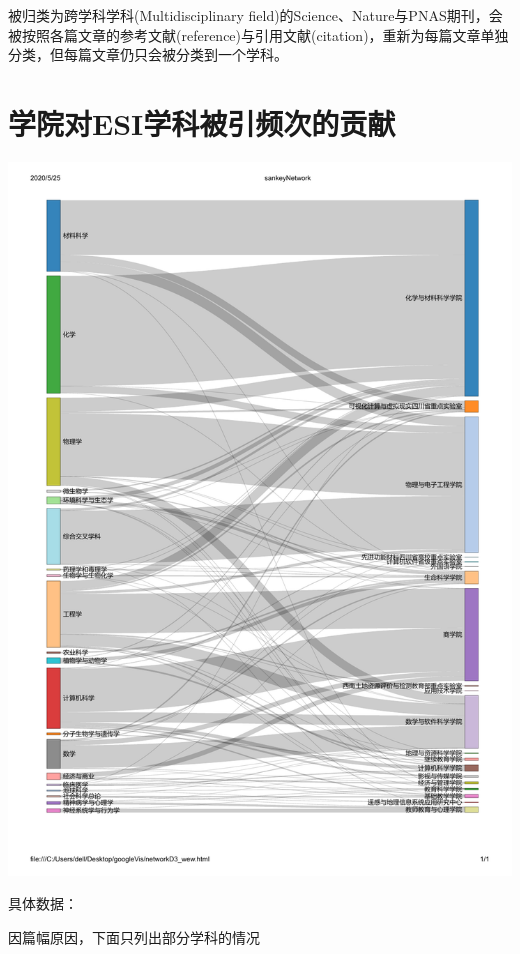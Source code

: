 \documentclass[cn, 11pt, fancy, hide]{elegantbook}
\begin{document}
被归类为跨学科学科(Multidisciplinary field)的Science、Nature与PNAS期刊，会被按照各篇文章的参考文献(reference)与引用文献(citation)，重新为每篇文章单独分类，但每篇文章仍只会被分类到一个学科。

\hypertarget{ux5b66ux9662ux5bf9esiux5b66ux79d1ux88abux5f15ux9891ux6b21ux7684ux8d21ux732e}{%
\section{学院对ESI学科被引频次的贡献}\label{ux5b66ux9662ux5bf9esiux5b66ux79d1ux88abux5f15ux9891ux6b21ux7684ux8d21ux732e}}

\begin{center}\includegraphics[width=1\linewidth]{sankeyNetwork/sankeyNetwork} \end{center}

具体数据：

因篇幅原因，下面只列出部分学科的情况
\end{document}
